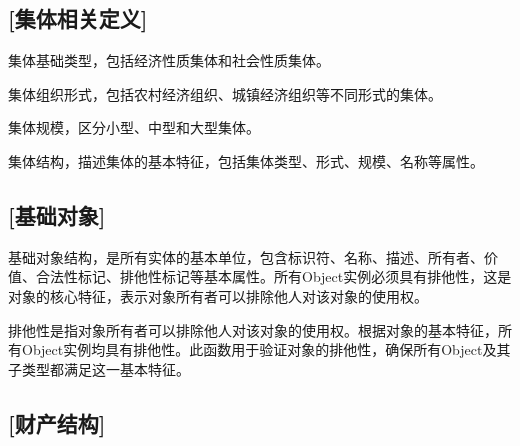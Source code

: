 \subsection{[集体相关定义]}

\begin{definition}\label{CollectiveBaseType}
\leanok
{}
\uses{}
集体基础类型，包括经济性质集体和社会性质集体。
\end{definition}

\begin{definition}\label{CollectiveForm}
\leanok
{}
\uses{}
集体组织形式，包括农村经济组织、城镇经济组织等不同形式的集体。
\end{definition}

\begin{definition}\label{CollectiveScale}
\leanok
{}
\uses{}
集体规模，区分小型、中型和大型集体。
\end{definition}

\begin{definition}\label{Collective}
\leanok
{}
集体结构，描述集体的基本特征，包括集体类型、形式、规模、名称等属性。
\end{definition}

\subsection{[基础对象]}

\begin{definition}\label{Object}
\leanok
{}
基础对象结构，是所有实体的基本单位，包含标识符、名称、描述、所有者、价值、合法性标记、排他性标记等基本属性。所有Object实例必须具有排他性，这是对象的核心特征，表示对象所有者可以排除他人对该对象的使用权。
\end{definition}

\begin{definition}\label{isExclusive}
\leanok
{}
排他性是指对象所有者可以排除他人对该对象的使用权。根据对象的基本特征，所有Object实例均具有排他性。此函数用于验证对象的排他性，确保所有Object及其子类型都满足这一基本特征。
\end{definition}

\subsection{[财产结构]}


